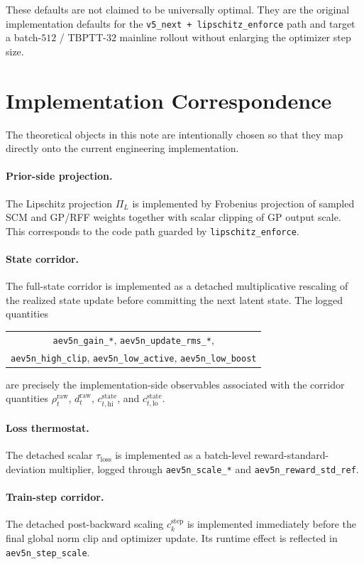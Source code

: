 \documentclass[11pt]{article}
\newcommand{\1}{\mathbf{1}}
\begin{document}
These defaults are not claimed to be universally optimal. They are the original implementation defaults for the \texttt{v5\_next + lipschitz\_enforce} path and target a batch-$512$ / TBPTT-$32$ mainline rollout without enlarging the optimizer step size.

\section{Implementation Correspondence}
The theoretical objects in this note are intentionally chosen so that they map directly onto the current engineering implementation.

\paragraph{Prior-side projection.}
The Lipschitz projection $\Pi_L$ is implemented by Frobenius projection of sampled SCM and GP/RFF weights together with scalar clipping of GP output scale. This corresponds to the code path guarded by \texttt{lipschitz\_enforce}.

\paragraph{State corridor.}
The full-state corridor is implemented as a detached multiplicative rescaling of the realized state update before committing the next latent state. The logged quantities
\begin{center}
\begin{tabular}{c}
\texttt{aev5n\_gain\_*}, \texttt{aev5n\_update\_rms\_*}, \\
\texttt{aev5n\_high\_clip}, \texttt{aev5n\_low\_active}, \texttt{aev5n\_low\_boost}
\end{tabular}
\end{center}
are precisely the implementation-side observables associated with the corridor quantities $\rho_t^{\mathrm{raw}}$, $d_t^{\mathrm{raw}}$, $c_{t,\mathrm{hi}}^{\mathrm{state}}$, and $c_{t,\mathrm{lo}}^{\mathrm{state}}$.

\paragraph{Loss thermostat.}
The detached scalar $\tau_{\mathrm{loss}}$ is implemented as a batch-level reward-standard-deviation multiplier, logged through \texttt{aev5n\_scale\_*} and \texttt{aev5n\_reward\_std\_ref}.

\paragraph{Train-step corridor.}
The detached post-backward scaling $c_k^{\mathrm{step}}$ is implemented immediately before the final global norm clip and optimizer update. Its runtime effect is reflected in \texttt{aev5n\_step\_scale}.
\end{document}
